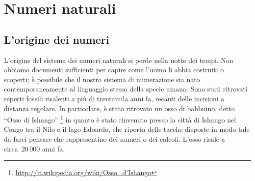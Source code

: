 


\chapter{Numeri naturali}


\section{L'origine dei numeri}
\label{sec:nat_origine}

L'origine del sistema dei numeri naturali si perde nella notte dei tempi. 
Non abbiamo documenti sufficienti per capire come l'uomo li abbia costruiti 
o scoperti; è possibile che il nostro sistema di numerazione sia nato 
contemporaneamente al linguaggio stesso della specie umana. 
Sono stati ritrovati reperti fossili risalenti a più di trentamila
anni fa, recanti delle incisioni a distanza regolare. 
In particolare, è stato ritrovato un osso di babbuino, 
detto ``Osso di Ishango''
\footnote{\url{http://it.wikipedia.org/wiki/Osso_d'Ishango}} 
in quanto è stato rinvenuto presso la città di Ishango nel Congo tra il 
Nilo e il lago Edoardo, che riporta delle tacche disposte in modo tale da 
farci pensare che rappresentino dei numeri o dei calcoli. L'osso risale a
circa~20\,000 anni fa.

